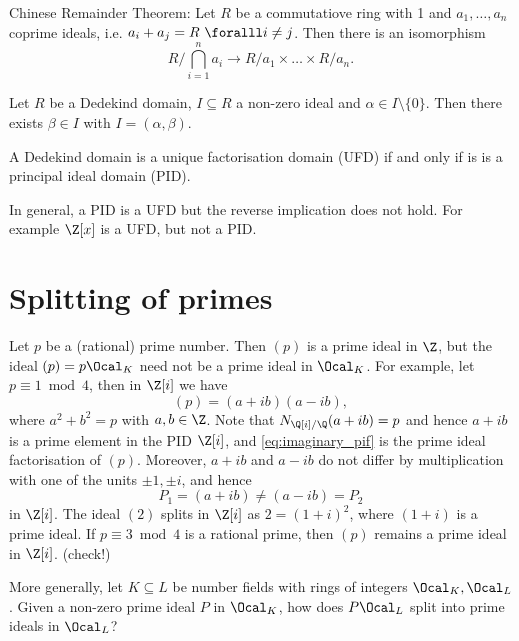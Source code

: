 
\begin{rem*}
	Chinese Remainder Theorem: Let \( R \) be a commutatiove ring with 1 and \( a_1, \dotsc, a_n \) coprime ideals, i.e. \( a_i + a_j = R\ \foralll i \neq j \).
	Then there is an isomorphism 
	\[ R/\bigcap_{i=1}^n a_i \to R/a_1 \times \dots \times R/a_n. \]
\end{rem*}

\begin{thmn}
	Let \( R \) be a Dedekind domain, \( I \subseteq R \) a non-zero ideal and \( \alpha \in I \setminus \{0\} \).
	Then there exists \( \beta \in I \) with \( I = (\alpha, \beta) \).
\end{thmn}

\begin{cor}
	A Dedekind domain is a unique factorisation domain (UFD) if and only if is is a principal ideal domain (PID).
\end{cor}

\begin{rem*}
	In general, a PID is a UFD but the reverse implication does not hold.
	For example \( \Z[x] \) is a UFD, but not a PID.
\end{rem*}

\section{Splitting of primes}

Let \( p \) be a (rational) prime number. Then \( (p) \) is a prime ideal in \( \Z \), but the ideal \( (p) = p \Ocal_K \) need not be a prime ideal in \( \Ocal_K \).
For example, let \( p \equiv 1 \bmod 4 \), then in \( \Z[i] \) we have 
\begin{equation}\label{eq:imaginary_pif}
	(p) = (a+ib)(a-ib),
\end{equation}
where \( a^2+b^2 = p \) with \( a,b \in \Z \).
Note that \( N_{\Q[i]/\Q} (a+ib) = p \) and hence \( a+ib \) is a prime element in the PID \( \Z[i] \), and \eqref{eq:imaginary_pif} is the prime ideal factorisation of \( (p) \).
Moreover, \( a+ib \) and \( a-ib \) do not differ by multiplication with one of the units \( \pm 1, \pm i \), and hence
\[ P_1 = (a+ib) \neq (a-ib) = P_2 \]
in \( \Z[i] \).
The ideal \( (2) \) splits in \( \Z[i] \) as \( 2 = (1+i)^2 \), where \( (1+i) \) is a prime ideal.
If \( p \equiv 3 \bmod 4 \) is a rational prime, then \( (p) \) remains a prime ideal in \( \Z[i] \). (check!)

\begin{frage*}
	More generally, let \( K \subseteq L \) be number fields with rings of integers \( \Ocal_K, \Ocal_L \).
	Given a non-zero prime ideal \( P \) in \( \Ocal_K \), how does \( P \Ocal_L \) split into prime ideals in \( \Ocal_L \)?
\end{frage*}

